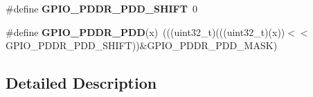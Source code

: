 \begin{DoxyCompactItemize}
\item 
\#define {\bfseries G\+P\+I\+O\+\_\+\+P\+D\+D\+R\+\_\+\+P\+D\+D\+\_\+\+S\+H\+I\+FT}~0\hypertarget{group__GPIO__Register__Masks_gacdd12c96f7650759c90a98bb606bd776}{}\label{group__GPIO__Register__Masks_gacdd12c96f7650759c90a98bb606bd776}

\item 
\#define {\bfseries G\+P\+I\+O\+\_\+\+P\+D\+D\+R\+\_\+\+P\+DD}(x)~(((uint32\+\_\+t)(((uint32\+\_\+t)(x))$<$$<$G\+P\+I\+O\+\_\+\+P\+D\+D\+R\+\_\+\+P\+D\+D\+\_\+\+S\+H\+I\+FT))\&G\+P\+I\+O\+\_\+\+P\+D\+D\+R\+\_\+\+P\+D\+D\+\_\+\+M\+A\+SK)\hypertarget{group__GPIO__Register__Masks_ga9836cb3ac719630f741fe6a0292083fc}{}\label{group__GPIO__Register__Masks_ga9836cb3ac719630f741fe6a0292083fc}

\end{DoxyCompactItemize}


\subsection{Detailed Description}
